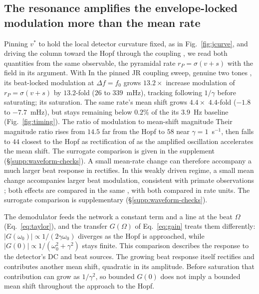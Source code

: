 \documentclass[11pt,a4paper]{article}
\newcommand{\Sig}{\sigma}
\providecommand{\DIFaddtex}[1]{{\protect\color{blue} \sf #1}} %
\providecommand{\DIFdeltex}[1]{{\protect\color{red} \scriptsize #1}} %
\providecommand{\DIFaddbegin}{} %
\providecommand{\DIFaddend}{} %
\providecommand{\DIFdelbegin}{} %
\providecommand{\DIFdelend}{} %
\providecommand{\DIFadd}[1]{\texorpdfstring{\DIFaddtex{#1}}{#1}} %
\providecommand{\DIFdel}[1]{\texorpdfstring{\DIFdeltex{#1}}{}} %
\begin{document}
\subsection{The resonance amplifies the envelope-locked modulation more than the mean rate}\label{sec:timing}
\DIFdelbegin \DIFdel{Pinning $v^*$ to hold the local detector
curvature fixed, as in Fig.~\ref{fig:jcurve}, and driving the column toward the Hopf
through the coupling , we read both quantities from the same observable, the pyramidal
rate $r_P=\Sig(v+s)$ with the field in its argument. With }\DIFdelend \DIFaddbegin \DIFadd{In the pinned JR coupling sweep, }\DIFaddend genuine two tones \DIFdelbegin \DIFdel{, its
beat-locked modulation }\DIFdelend at $\Delta f=f_0$
\DIFdelbegin \DIFdel{grows $13.2\times$ }\DIFdelend \DIFaddbegin \DIFadd{increase modulation of $r_P=\Sig(v+s)$ by $13.2$-fold }\DIFaddend ($26$ to $339$~mHz),
\DIFdelbegin \DIFdel{tracking }\DIFdelend \DIFaddbegin \DIFadd{following }\DIFaddend $1/\gamma$ before \DIFdelbegin \DIFdel{saturating; its }\DIFdelend \DIFaddbegin \DIFadd{saturation. The same rate's }\DIFaddend mean shift grows
\DIFdelbegin \DIFdel{$4.4\times$ }\DIFdelend \DIFaddbegin \DIFadd{$4.4$-fold }\DIFaddend ($-1.8$ to $-7.7$~mHz), \DIFdelbegin \DIFdel{but stays }\DIFdelend \DIFaddbegin \DIFadd{remaining }\DIFaddend below $0.2\%$ of \DIFdelbegin \DIFdel{the }\DIFdelend \DIFaddbegin \DIFadd{its
}\DIFaddend $3.9$~Hz baseline (Fig.~\ref{fig:timing}). \DIFdelbegin \DIFdel{The ratio of modulation to mean-shift magnitude }\DIFdelend \DIFaddbegin \DIFadd{Their magnitude ratio }\DIFaddend rises
from $14.5$ \DIFdelbegin \DIFdel{far from the Hopf }\DIFdelend to $58$ near $\gamma=1$~s$^{-1}$, then falls to $44$ \DIFdelbegin \DIFdel{closest
to the Hopf as
rectification of }\DIFdelend \DIFaddbegin \DIFadd{as
}\DIFaddend the amplified oscillation \DIFdelbegin \DIFdel{accelerates the mean shift. The surrogate comparison is given in the supplement (\S\ref{supp:waveform-checks}). A small mean-rate change can therefore accompany a much
larger beat response in }\DIFdelend \DIFaddbegin \DIFadd{rectifies. In }\DIFaddend this weakly driven regime, \DIFaddbegin \DIFadd{a small
mean change accompanies larger beat modulation, }\DIFaddend consistent with primate observations
\cite{vieira2024}\DIFdelbegin \DIFdel{; both effects are compared in the same }\DIFdelend \DIFaddbegin \DIFadd{, with both compared in }\DIFaddend rate units. \DIFaddbegin \DIFadd{The surrogate
comparison is supplementary (\S\ref{supp:waveform-checks}).
}\DIFaddend

The demodulator feeds the network a constant term and a line at the beat $\Omega$
(Eq.~\eqref{eq:taylor}), and the transfer $G(\Omega)$ of Eq.~\eqref{eq:gain} treats them
differently: $|G(\omega_0)|\propto1/(2\gamma\omega_0)$ diverges as the Hopf is approached,
while $|G(0)|\propto1/(\omega_0^2+\gamma^2)$ stays finite. This comparison describes
the response to the detector's DC and beat sources. The growing beat response
itself rectifies and contributes another mean shift, quadratic in its amplitude.
Before saturation that contribution can grow as $1/\gamma^2$, so bounded $G(0)$
does not imply a bounded mean shift throughout the approach to the Hopf.
\end{document}
